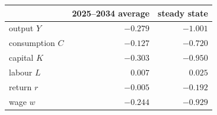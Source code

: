 \begin{tabular}{@{}lrr@{}}
\toprule
 & 2025--2034 average & steady state \\
\midrule
output $Y$        & $-0.279$ & $-1.001$ \\
consumption $C$   & $-0.127$ & $-0.720$ \\
capital $K$       & $-0.303$ & $-0.950$ \\
labour $L$        & $0.007$ & $0.025$ \\
return $r$        & $-0.005$ & $-0.192$ \\
wage $w$          & $-0.244$ & $-0.929$ \\
\bottomrule
\end{tabular}
